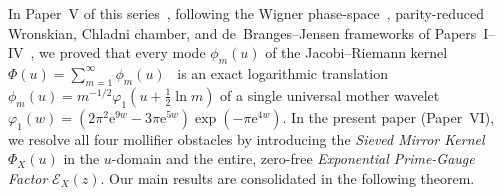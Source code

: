 \documentclass[11pt,reqno]{amsart}
\theoremstyle{definition}
\theoremstyle{remark}
\numberwithin{equation}{section}
\newcommand{\ee}{\mathrm{e}}
\begin{document}
In Paper~V of this series~\cite{missiaen2026paper5}, following the Wigner phase-space~\cite{wigner1932,hudson1974}, parity-reduced Wronskian, Chladni chamber, and de~Branges--Jensen frameworks of Papers~I--IV~\cite{missiaen2026paper1,missiaen2026paper2,missiaen2026paper3,missiaen2026paper4}, we proved that every mode $\phi_m(u)$ of the Jacobi--Riemann kernel $\Phi(u) = \sum_{m=1}^{\infty} \phi_m(u)$~\cite{jacobi1829,polya1926,titchmarsh1986} is an exact logarithmic translation $\phi_m(u) = m^{-1/2}\varphi_1(u + \frac{1}{2}\ln m)$ of a single universal mother wavelet $\varphi_1(w) = (2\pi^2\ee^{9w} - 3\pi\ee^{5w})\exp(-\pi\ee^{4w})$. In the present paper (Paper~VI), we resolve all four mollifier obstacles by introducing the \emph{Sieved Mirror Kernel} $\Phi_X(u)$ in the $u$-domain and the entire, zero-free \emph{Exponential Prime-Gauge Factor} $\mathcal{E}_X(z)$. Our main results are consolidated in the following theorem.
\end{document}
